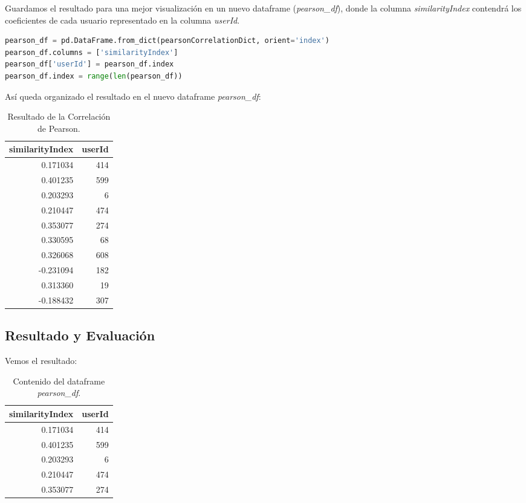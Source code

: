 \documentclass{uimppracticas}
\begin{document}
Guardamos el resultado para una mejor visualización en un nuevo dataframe (\textit{pearson\_df}), donde la columna \textit{similarityIndex} contendrá los coeficientes de cada usuario representado en la columna \textit{userId}.

\begin{lstlisting}[language=python, basicstyle=\small]
pearson_df = pd.DataFrame.from_dict(pearsonCorrelationDict, orient='index')
pearson_df.columns = ['similarityIndex']
pearson_df['userId'] = pearson_df.index
pearson_df.index = range(len(pearson_df))
\end{lstlisting}

Así queda organizado el resultado en el nuevo dataframe \textit{pearson\_df}:

\begin{table}[H]
	\centering
	\begin{tabular}{rr}
		\toprule
		similarityIndex &  userId \\
		\midrule
		0.171034 &     414 \\
		0.401235 &     599 \\
		0.203293 &       6 \\
		0.210447 &     474 \\
		0.353077 &     274 \\
		0.330595 &      68 \\
		0.326068 &     608 \\
		-0.231094 &     182 \\
		0.313360 &      19 \\
		-0.188432 &     307 \\
		\bottomrule
	\end{tabular}
	\caption{Resultado de la Correlación de Pearson.}
\label{pearson_df}
\end{table}


\subsection{Resultado y Evaluación}

Vemos el resultado:

\begin{table}[h]
	\centering
	\begin{tabular}{rr}
		\toprule
		similarityIndex &  userId \\
		\midrule
		0.171034 &     414 \\
		0.401235 &     599 \\
		0.203293 &       6 \\
		0.210447 &     474 \\
		0.353077 &     274 \\
		\bottomrule
	\end{tabular}
	\caption{Contenido del dataframe \textit{pearson\_df}.}
	\label{pearson}
\end{table}
\end{document}
